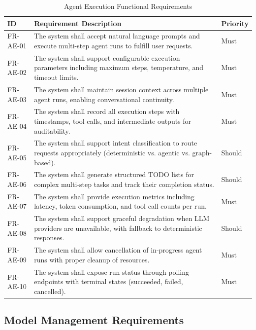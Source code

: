 \begin{table}[htbp]
\centering
\caption{Agent Execution Functional Requirements}
\label{tab:fr-agent-execution}
\small
\begin{tabularx}{\textwidth}{|l|X|l|}
\hline
\textbf{ID} & \textbf{Requirement Description} & \textbf{Priority} \\
\hline
FR-AE-01 & The system shall accept natural language prompts and execute multi-step agent runs to fulfill user requests. & Must \\
\hline
FR-AE-02 & The system shall support configurable execution parameters including maximum steps, temperature, and timeout limits. & Must \\
\hline
FR-AE-03 & The system shall maintain session context across multiple agent runs, enabling conversational continuity. & Must \\
\hline
FR-AE-04 & The system shall record all execution steps with timestamps, tool calls, and intermediate outputs for auditability. & Must \\
\hline
FR-AE-05 & The system shall support intent classification to route requests appropriately (deterministic vs. agentic vs. graph-based). & Should \\
\hline
FR-AE-06 & The system shall generate structured TODO lists for complex multi-step tasks and track their completion status. & Should \\
\hline
FR-AE-07 & The system shall provide execution metrics including latency, token consumption, and tool call counts per run. & Must \\
\hline
FR-AE-08 & The system shall support graceful degradation when LLM providers are unavailable, with fallback to deterministic responses. & Should \\
\hline
FR-AE-09 & The system shall allow cancellation of in-progress agent runs with proper cleanup of resources. & Must \\
\hline
FR-AE-10 & The system shall expose run status through polling endpoints with terminal states (succeeded, failed, cancelled). & Must \\
\hline
\end{tabularx}
\end{table}

\subsection{Model Management Requirements}
\label{subsec:fr-model-management}

